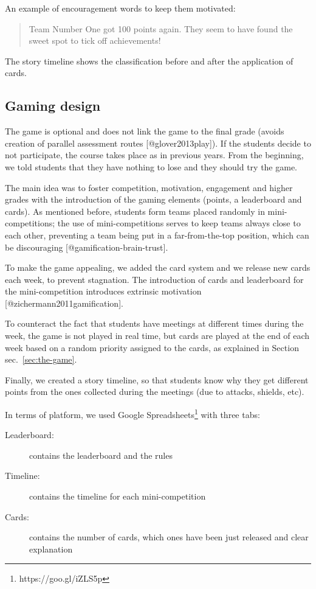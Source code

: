 \documentclass[
]{article}
\begin{document}
An example of encouragement words to keep them motivated:

\begin{quote}
Team Number One got 100 points again.
They seem to have found the sweet spot to tick off achievements!
\end{quote}

The story timeline shows the classification before and after the
application of cards.

\hypertarget{gaming-design}{%
\subsection{Gaming design}\label{gaming-design}}

The game is optional and does not link the game to the final grade
(avoids creation of parallel assessment routes {[}@glover2013play{]}).
If the students decide to not participate, the course takes place as in
previous years. From the beginning, we told students that they have
nothing to lose and they should try the game.

The main idea was to foster competition, motivation, engagement and
higher grades with the introduction of the gaming elements (points, a
leaderboard and cards). As mentioned before, students form teams placed
randomly in mini-competitions; the use of mini-competitions serves to
keep teams always close to each other, preventing a team being put in a
far-from-the-top position, which can be discouraging
{[}@gamification-brain-trust{]}.

To make the game appealing, we added the card system and we release new
cards each week, to prevent stagnation. The introduction of cards and
leaderboard for the mini-competition introduces extrinsic motivation
{[}@zichermann2011gamification{]}.

To counteract the fact that students have meetings at different times
during the week, the game is not played in real time, but cards are
played at the end of each week based on a random priority assigned to
the cards, as explained in Section sec.~\ref{sec:the-game}.

Finally, we created a story timeline, so that students know why they get
different points from the ones collected during the meetings (due to
attacks, shields, etc).

In terms of platform, we used Google
Spreadsheets\footnote{https://goo.gl/iZLS5p} with three tabs:

\begin{description}
\item[Leaderboard:] contains the leaderboard and the rules
\item[Timeline:] contains the timeline for each mini-competition
\item[Cards:] contains the number of cards, which ones have been just released and clear explanation
\end{description}
\end{document}
